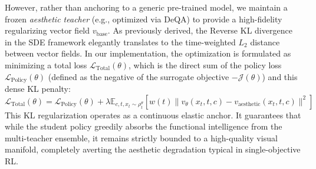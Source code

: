 However, rather than anchoring to a generic pre-trained model, we maintain a frozen \textit{aesthetic teacher} (e.g., optimized via DeQA) to provide a high-fidelity regularizing vector field $v_{\text{base}}$. As previously derived, the Reverse KL divergence in the SDE framework elegantly translates to the time-weighted $L_2$ distance between vector fields. In our implementation, the optimization is formulated as minimizing a total loss $\mathcal{L}_{\text{Total}}(\theta)$, which is the direct sum of the policy loss $\mathcal{L}_{\text{Policy}}(\theta)$ (defined as the negative of the surrogate objective $-\mathcal{J}(\theta)$) and this dense KL penalty:
\begin{equation}
\mathcal{L}_{\text{Total}}(\theta) = \mathcal{L}_{\text{Policy}}(\theta) + \lambda \mathbb{E}_{c, t, x_t \sim \rho_t^\theta} \left[ w(t) \| v_\theta(x_t, t, c) - v_{\text{aesthetic}}(x_t, t, c) \|^2 \right]
\end{equation}
This KL regularization operates as a continuous elastic anchor. It guarantees that while the student policy greedily absorbs the functional intelligence from the multi-teacher ensemble, it remains strictly bounded to a high-quality visual manifold, completely averting the aesthetic degradation typical in single-objective RL.